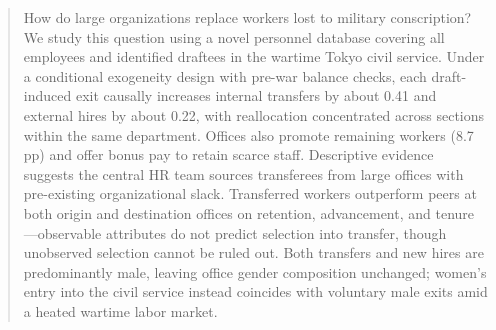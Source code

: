 \begin{abstract}
    How do large organizations replace workers lost to military conscription? We study this question using a novel personnel database covering all employees and identified draftees in the wartime Tokyo civil service. Under a conditional exogeneity design with pre-war balance checks, each draft-induced exit causally increases internal transfers by about 0.41 and external hires by about 0.22, with reallocation concentrated across sections within the same department. Offices also promote remaining workers (8.7 pp) and offer bonus pay to retain scarce staff. Descriptive evidence suggests the central HR team sources transferees from large offices with pre-existing organizational slack. Transferred workers outperform peers at both origin and destination offices on retention, advancement, and tenure---observable attributes do not predict selection into transfer, though unobserved selection cannot be ruled out. Both transfers and new hires are predominantly male, leaving office gender composition unchanged; women’s entry into the civil service instead coincides with voluntary male exits amid a heated wartime labor market.
\end{abstract}